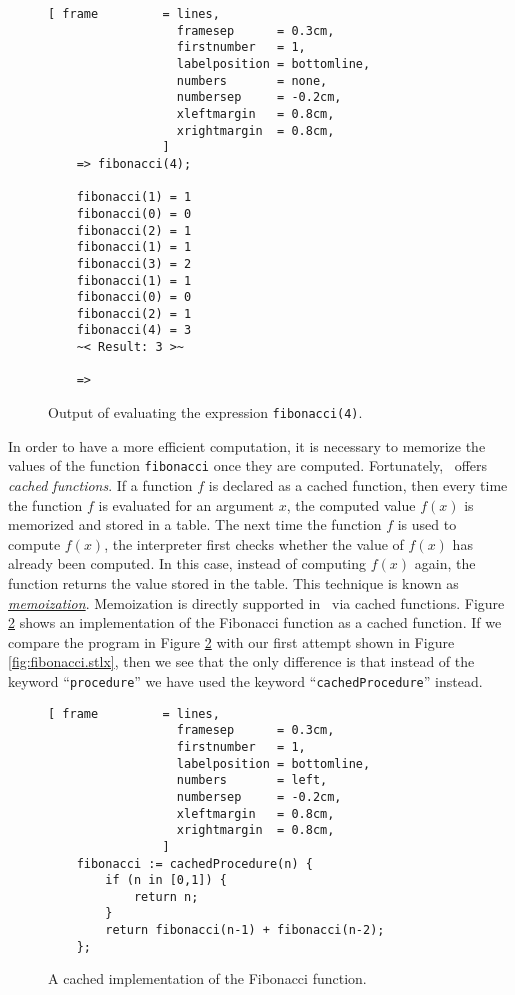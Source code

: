\begin{figure}[!ht]
\centering
\begin{Verbatim}[ frame         = lines, 
                  framesep      = 0.3cm, 
                  firstnumber   = 1,
                  labelposition = bottomline,
                  numbers       = none,
                  numbersep     = -0.2cm,
                  xleftmargin   = 0.8cm,
                  xrightmargin  = 0.8cm,
                ]
    => fibonacci(4);
    
    fibonacci(1) = 1
    fibonacci(0) = 0
    fibonacci(2) = 1
    fibonacci(1) = 1
    fibonacci(3) = 2
    fibonacci(1) = 1
    fibonacci(0) = 0
    fibonacci(2) = 1
    fibonacci(4) = 3
    ~< Result: 3 >~
    
    => 
\end{Verbatim}
\vspace*{-0.3cm}
\caption{Output of evaluating the expression \texttt{fibonacci(4)}.}
\label{fig:fibonacci.trace}
\end{figure}


In order to have a more efficient computation, it is necessary to memorize the values of
the function \texttt{fibonacci} once they are computed.  Fortunately, \setlx\ offers
\emph{cached functions}.  If a function $f$ is declared as a cached function, then every
time the function $f$ is evaluated for an argument $x$, the computed value $f(x)$ is
memorized and stored in a table.  The next time the function $f$ is used to compute
$f(x)$, the interpreter first checks whether the value of $f(x)$ has already been
computed.  In this case, instead of computing $f(x)$ again,  the function returns the
value stored in the table.  This technique is known as
\href{http://en.wikipedia.org/wiki/Memoization}{\emph{memoization}}.
Memoization is directly supported in \setlx\ via cached functions.
Figure
\ref{fig:fibonacci-cached.stlx} shows an implementation of the Fibonacci function as a
cached function.  If we compare the program in Figure
\ref{fig:fibonacci-cached.stlx} with our first attempt shown in Figure
\ref{fig:fibonacci.stlx}, then we see that the only difference is that instead of the
keyword ``\texttt{procedure}'' we have used the keyword ``\texttt{cachedProcedure}'' instead.


\begin{figure}[!ht]
\centering
\begin{Verbatim}[ frame         = lines, 
                  framesep      = 0.3cm, 
                  firstnumber   = 1,
                  labelposition = bottomline,
                  numbers       = left,
                  numbersep     = -0.2cm,
                  xleftmargin   = 0.8cm,
                  xrightmargin  = 0.8cm,
                ]
    fibonacci := cachedProcedure(n) {
        if (n in [0,1]) {
            return n;
        } 
        return fibonacci(n-1) + fibonacci(n-2);
    };
\end{Verbatim}
\vspace*{-0.3cm}
\caption{A cached implementation of the Fibonacci function.}
\label{fig:fibonacci-cached.stlx}
\end{figure}


